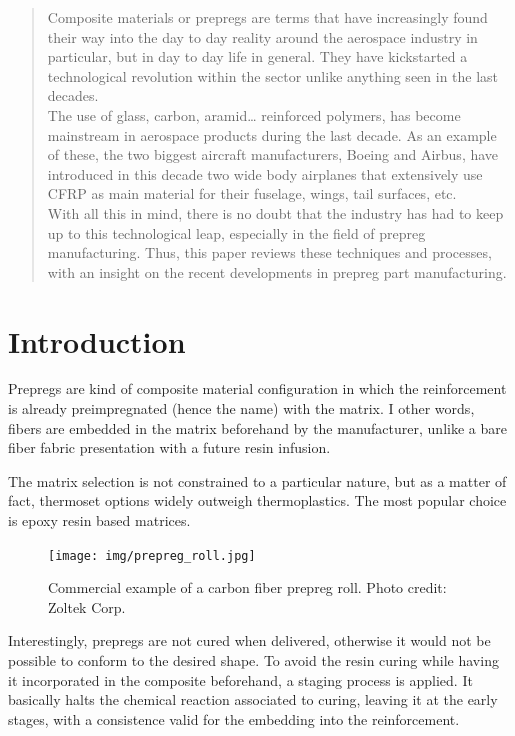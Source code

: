 \begin{abstract}

Composite materials or prepregs are terms that have increasingly found their
way into the day to day reality around the aerospace industry in particular, but
in day to day life in general. They have kickstarted a technological revolution
within the sector unlike anything seen in the last decades.\\

The use of glass, carbon, aramid… reinforced polymers, has become mainstream
in aerospace products during the last decade. As an example of these, the two
biggest aircraft manufacturers, Boeing and Airbus, have introduced in this decade
two wide body airplanes that extensively use CFRP as main material for their fuselage,
wings, tail surfaces, etc.\\

With all this in mind, there is no doubt that the industry has had to keep up
to this technological leap, especially in the field of prepreg manufacturing.
Thus, this paper reviews these techniques and processes, with an insight on the
recent developments in prepreg part manufacturing.\\

\end{abstract}


\section{Introduction}

Prepregs are kind of composite material configuration in which the reinforcement
is already preimpregnated (hence the name) with the matrix. I other words, fibers
are embedded in the matrix beforehand by the manufacturer, unlike a bare fiber
fabric presentation with a future resin infusion.

The matrix selection is not constrained to a particular nature, but as a matter
of fact, thermoset options widely outweigh thermoplastics. The most popular choice
is epoxy resin based matrices.

\begin{figure}[h]
	\centering
	\texttt{[image: img/prepreg\_roll.jpg]}
	\caption[Carbon fiber prepreg roll]{Commercial example of a carbon fiber prepreg roll.
	Photo credit: Zoltek Corp.}
	\label{fig:prepreg_roll}
\end{figure}

Interestingly, prepregs are not cured when delivered, otherwise it would not be
possible to conform to the desired shape. To avoid the resin curing while having
it incorporated in the composite beforehand, a staging process is applied. It
basically halts the chemical reaction associated to curing, leaving it at the early
stages, with a consistence valid for the embedding into the reinforcement.\\

